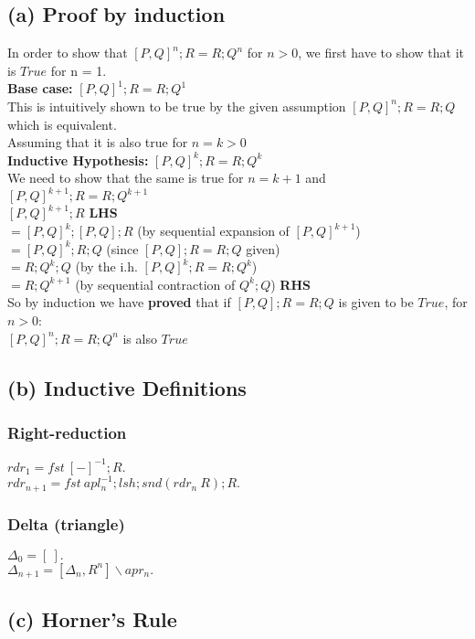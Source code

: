 \documentclass[a4paper,10pt]{article}
\begin{document}
\subsection*{(a) Proof by induction}
In order to show that $[P,Q]^{n};R = R;Q^n$ for $n>0$, we first have to show that it is $True$ for n = 1.
\\[0.5cm]
\textbf{Base case:} $[P,Q]^{1};R=R;Q^1$
\\[0.5cm]
This is intuitively shown to be true by the given assumption $[P,Q]^{n};R=R;Q$ which is equivalent.
\\[0.5cm]
Assuming that it is also true for  $n = k > 0$ 
\\[0.5cm]
\textbf{Inductive Hypothesis:} $[P,Q]^{k};R = R;Q^k$
\\[0.5cm]
We need to show that the same is true for $n = k+1$ and $[P,Q]^{k+1};R = R;Q^{k+1}$
\\[0.5cm]
 $[P,Q]^{k+1};R $ \textbf{LHS}
\\[0.25cm]
$= [P,Q]^k;[P,Q];R$ (by sequential expansion of $[P,Q]^{k+1}$)
\\[0.25cm]
$= [P,Q]^k;R;Q$ (since $[P,Q];R = R;Q$ given)
\\[0.25cm]
$= R;Q^k;Q$ (by the i.h. $[P,Q]^{k};R = R;Q^k$)
\\[0.25cm]
$= R;Q^{k+1}$ (by sequential contraction of $Q^{k};Q$)  \textbf{RHS}
\\[0.5cm]
So by induction we have \textbf{proved} that if $[P,Q];R = R;Q$ is given to be $True$, for $n>0$:
\\[0.5cm]
$[P,Q]^{n};R = R;Q^n$ 
is also $True$
\subsection*{(b) Inductive Definitions}
\subsubsection*{Right-reduction}
$rdr_1 = fst\:  [-]^{-1};R.$ \\[0.25cm]
$rdr_{n+1} = fst\:  apl_{n}^{-1};lsh;snd(rdr_n\: R);R.$
\subsubsection*{Delta (triangle)}
$\Delta_0 = [\: ].$ \\[0.25cm]
$\Delta_{n+1} = [\Delta_{n},R^n]\backslash apr_n.$
\subsection*{(c) Horner's Rule}
\end{document}
